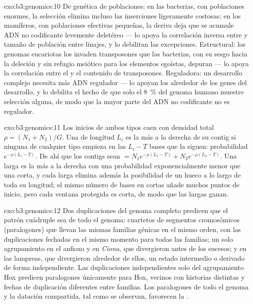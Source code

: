 \begin{solution}{exo:b3:genomics:10}
De genética de poblaciones: en las bacterias, con poblaciones enormes, la
selección elimina incluso las inserciones ligeramente costosas; en los
mamíferos, con poblaciones efectivas pequeñas, la deriva deja que se
acumule ADN no codificante levemente deletéreo --- lo apoya la
correlación inversa entre  y tamaño de población entre
linajes, y lo debilitan las excepciones. Estructural: los genomas
eucariotas los invaden transposones que las bacterias, con su sesgo hacia
la deleción y sin refugio meiótico para los elementos egoístas, depuran
--- lo apoya la correlación entre el  y el contenido de
transposones. Reguladora: un desarrollo complejo necesita más ADN
regulador --- lo apoyan los 
alrededor de los genes del desarrollo, y lo debilita el hecho de que solo
el \qty{8}{\%} del genoma humano muestre selección alguna, de modo que la
mayor parte del ADN no codificante no es regulador.
\end{solution}

\begin{solution}{exo:b3:genomics:11}
Los inicios de ambos tipos caen con densidad total $\rho = (N_{1} +
N_{2})/G$. Una  de longitud $L_{i}$ es la más a la derecha de su
contig si ninguna  de cualquier tipo empieza en las $L_{i} - T$
bases que la siguen: probabilidad $e^{-\rho(L_{i} - T)}$. De ahí que los
contigs sean $= N_{1}
e^{-\rho(L_{1} - T)} + N_{2} e^{-\rho(L_{2} - T)}$. Una  larga es
la más a la derecha con una probabilidad exponencialmente menor que una
corta, y cada  larga elimina además la posibilidad de un hueco a
lo largo de toda su longitud; el mismo número de bases en  cortas
añade muchos puntos de inicio, pero cada ventana protegida es corta, de
modo que las  largas ganan.
\end{solution}

\begin{solution}{exo:b3:genomics:12}
Dos duplicaciones del genoma completo predicen que el patrón cuádruple
sea de todo el genoma: cuartetos de segmentos cromosómicos 
(paralogones) que llevan las mismas familias génicas en el mismo orden,
con las duplicaciones fechadas en el mismo momento para todas las
familias; un solo agrupamiento en el anfioxo y en \emph{Ciona}, que
divergieron antes de los sucesos; y en las lampreas, que divergieron
alrededor de ellos, un estado intermedio o derivado de forma
independiente. Las duplicaciones independientes solo del agrupamiento Hox
predicen paralogones únicamente para Hox, vecinos con historias distintas
y fechas de duplicación diferentes entre familias. Los paralogones de
todo el genoma y la datación compartida, tal como se observan, favorecen
la .
\end{solution}

